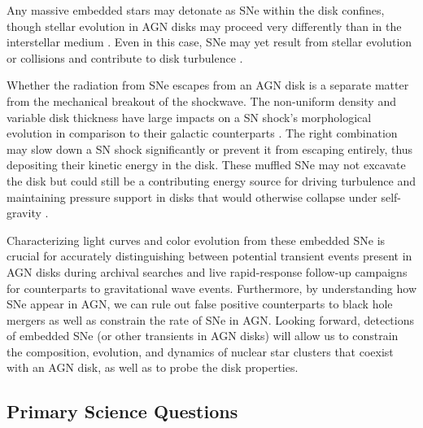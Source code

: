 
Any massive embedded stars may detonate as SNe within the disk confines, though stellar evolution in AGN disks may proceed very differently than in the interstellar medium \citep[ISM,][]{CantielloJermynLin21}.
Even in this case, SNe may yet result from stellar evolution \citep{Jermyn+21} or collisions and contribute to disk turbulence \citep{Moranchel+21}.

Whether the radiation from SNe escapes from an AGN disk is a separate matter from the mechanical breakout of the shockwave.
The non-uniform density and variable disk thickness have large impacts on a SN shock's morphological evolution in comparison to their galactic counterparts \citep{MacLowMcCray88}.
The right combination may slow down a SN shock significantly or prevent it from escaping entirely, thus depositing their kinetic energy in the disk.
These muffled SNe may not excavate the disk but could still be a contributing energy source for driving turbulence and maintaining pressure support in disks that would otherwise collapse under self-gravity \citep{Rozyczka+95,Moranchel+21}.

Characterizing light curves and color evolution from these embedded SNe is crucial for accurately distinguishing between potential transient events present in AGN disks during archival searches and live rapid-response follow-up campaigns for counterparts to gravitational wave events.
Furthermore, by understanding how SNe appear in AGN, we can rule out false positive counterparts to black hole mergers as well as constrain the rate of SNe in AGN.
Looking forward, detections of embedded SNe (or other transients in AGN disks) will allow us to constrain the composition, evolution, and dynamics of nuclear star clusters that coexist with an AGN disk, as well as to probe the disk properties.


\subsection{Primary Science Questions}

